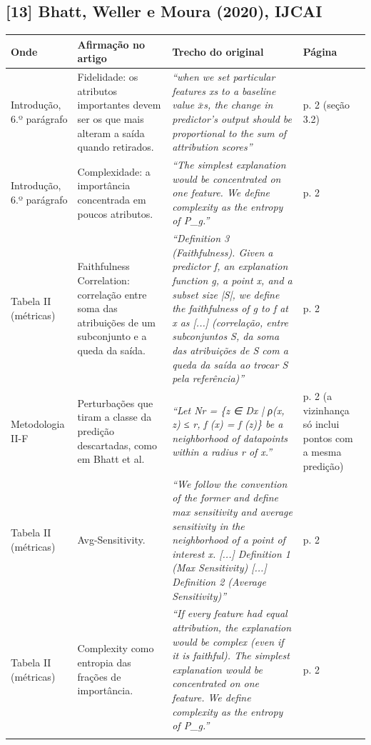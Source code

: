 \documentclass[11pt,a4paper]{article}
\begin{document}
\subsection*{[13] Bhatt, Weller e Moura (2020), IJCAI}
\begin{longtable}{>{\raggedright\arraybackslash}p{2.6cm}>{\raggedright\arraybackslash}p{4.6cm}>{\raggedright\arraybackslash}p{7.6cm}>{\raggedright\arraybackslash}p{1.4cm}}
\toprule
\textbf{Onde} & \textbf{Afirmação no artigo} & \textbf{Trecho do original} & \textbf{Página} \\
\midrule
Introdução, 6.º parágrafo & Fidelidade: os atributos importantes devem ser os que mais alteram a saída quando retirados. & \textit{``when we set particular features xs to a baseline value \ensuremath{\bar{x}}s, the change in predictor's output should be proportional to the sum of attribution scores''} & p. 2 (seção 3.2) \\
\addlinespace
Introdução, 6.º parágrafo & Complexidade: a importância concentrada em poucos atributos. & \textit{``The simplest explanation would be concentrated on one feature. We define complexity as the entropy of P\_g.''} & p. 2 \\
\addlinespace
Tabela II (métricas) & Faithfulness Correlation: correlação entre soma das atribuições de um subconjunto e a queda da saída. & \textit{``Definition 3 (Faithfulness). Given a predictor f, an explanation function g, a point x, and a subset size |S|, we define the faithfulness of g to f at x as [...] (correlação, entre subconjuntos S, da soma das atribuições de S com a queda da saída ao trocar S pela referência)''} & p. 2 \\
\addlinespace
Metodologia II-F & Perturbações que tiram a classe da predição descartadas, como em Bhatt et al. & \textit{``Let Nr = \{z ∈ Dx | ρ(x, z) ≤ r, f (x) = f (z)\} be a neighborhood of datapoints within a radius r of x.''} & p. 2 (a vizinhança só inclui pontos com a mesma predição) \\
\addlinespace
Tabela II (métricas) & Avg-Sensitivity. & \textit{``We follow the convention of the former and define max sensitivity and average sensitivity in the neighborhood of a point of interest x. [...] Definition 1 (Max Sensitivity) [...] Definition 2 (Average Sensitivity)''} & p. 2 \\
\addlinespace
Tabela II (métricas) & Complexity como entropia das frações de importância. & \textit{``If every feature had equal attribution, the explanation would be complex (even if it is faithful). The simplest explanation would be concentrated on one feature. We define complexity as the entropy of P\_g.''} & p. 2 \\
\addlinespace
\bottomrule
\end{longtable}
\end{document}
